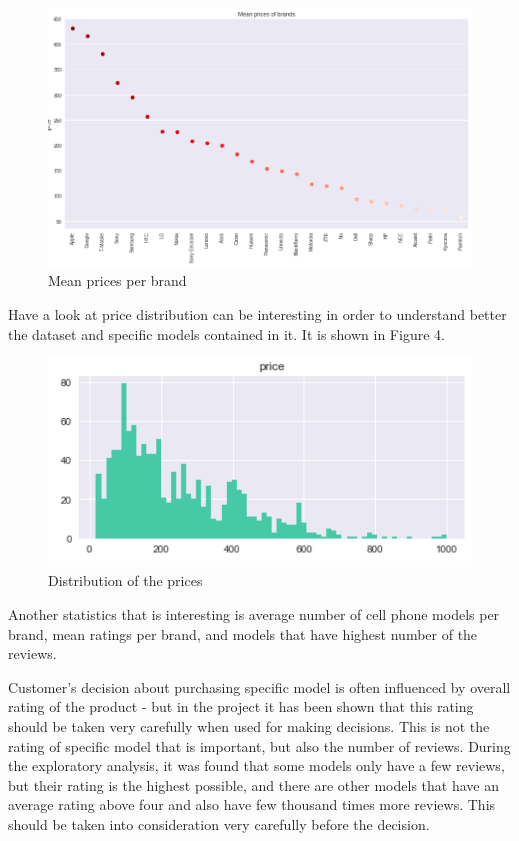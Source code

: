 \documentclass[11pt]{article}
\begin{document}
\begin{figure}[h!]
  \centering
    \includegraphics[width=\linewidth]{meanPrices.png}
  \caption{Mean prices per brand}
  \label{fig:meanPricePerBrand}
\end{figure}

Have a look at price distribution can be interesting in order to understand better the dataset and specific models contained in it. It is shown in Figure 4. 

\begin{figure}[h!]
  \centering
    \includegraphics[width=\linewidth]{priceDistribution.png}
  \caption{Distribution of the prices}
  \label{fig:priceDistribution}
\end{figure}

Another statistics that is interesting is average number of cell phone models per brand, mean ratings per brand, and models that have highest number of the reviews. 

Customer's decision about purchasing specific model is often influenced by overall rating of the product - but in the project it has been shown that this rating should be taken very carefully when used for making decisions. This is not the rating of specific model that is important, but also the number of reviews. During the exploratory analysis, it was found that some models only have a few reviews, but their rating is the highest possible, and there are other models that have an average rating above four and also have few thousand times more reviews. This should be taken into consideration very carefully before the decision. \par\par
\end{document}

